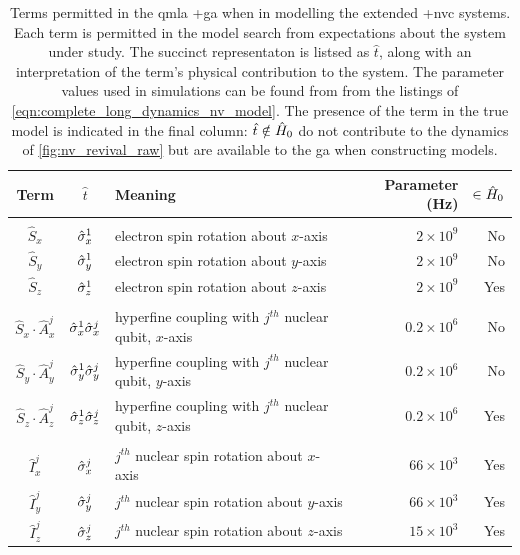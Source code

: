 \par 

\setlength{\tabcolsep}{6.5pt}
\begin{table}[t]
    \begin{tabular}{cclrr}
        Term & $\hat{t}$ & Meaning & Parameter (Hz) & $ \in \hat{H}_0$ \\
        \hline
        \\
        $\hat{S}_x$ & $\hat{\sigma}_{x}^1$ & electron spin rotation about $x$-axis & $ 2\times 10^9 $ & No \\
        $\hat{S}_y$ & $\hat{\sigma}_{y}^1$ & electron spin rotation about $y$-axis & $ 2\times 10^9 $ & No \\
        $\hat{S}_z$ & $\hat{\sigma}_{z}^1$ & electron spin rotation about $z$-axis & $ 2\times 10^9 $ & Yes \\
        \\
        $\hat{S}_x \cdot \hat{A}_x^j$ & $\hat{\sigma}_{x}^1 \hat{\sigma}_{x}^j$ & hyperfine coupling with $j^{th}$ nuclear qubit, $x$-axis & $ 0.2 \times 10^6 $ & No \\
        $\hat{S}_y \cdot \hat{A}_y^j$ & $\hat{\sigma}_{y}^1 \hat{\sigma}_{y}^j$ & hyperfine coupling with $j^{th}$ nuclear qubit, $y$-axis & $ 0.2 \times 10^6 $ & No \\
        $\hat{S}_z \cdot \hat{A}_z^j$ & $\hat{\sigma}_{z}^1 \hat{\sigma}_{z}^j$ & hyperfine coupling with $j^{th}$ nuclear qubit, $z$-axis & $ 0.2 \times 10^6 $ & Yes \\
        \\
        $\hat{I}_x^j$ & $\hat{\sigma}_{x}^j$ & $j^{th}$ nuclear spin rotation about $x$-axis & $ 66\times 10^3$ & Yes \\
        $\hat{I}_y^j$ & $\hat{\sigma}_{y}^j$ & $j^{th}$ nuclear spin rotation about $y$-axis & $ 66\times 10^3 $ & Yes \\
        $\hat{I}_z^j$ & $\hat{\sigma}_{z}^j$ & $j^{th}$ nuclear spin rotation about $z$-axis & $ 15\times 10^3 $ & Yes \\
        \hline 
    \end{tabular}
    \caption[Terms permitted in the QMLA genetic algorithm when modelling the extended nitrogen-vacancy centre systems]{
        Terms permitted in the \gls{qmla} \glsxtrfull+{ga} when in modelling the extended \glsxtrlong+{nvc} systems.
        Each term is permitted in the \gls{model search} from expectations about the system under study. 
        The succinct representaton is listsed as $\hat{t}$, along with an interpretation of the term's physical contribution to the system. 
        The parameter values used in simulations can be found from from the listings of \cref{eqn:complete_long_dynamics_nv_model}. 
        The presence of the term in the \gls{true model} is indicated in the final column: 
            $\hat{t}\notin\hat{H}_0$ do not contribute to the dynamics of \cref{fig:nv_revival_raw} 
            but are available to the \gls{ga} when constructing models.
    }
    \label{table:nv_gen_alg_term_params}
\end{table}


